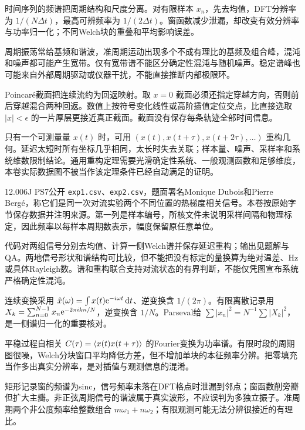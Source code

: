 时间序列的频谱把周期结构和尺度分离。对有限样本 $x_n$，先去均值，DFT分辨率为 $1/(N\Delta t)$，最高可辨频率为 $1/(2\Delta t)$。窗函数减少泄漏，却改变有效分辨率与功率归一化；不同Welch块的重叠和平均影响误差。

周期振荡常给基频和谐波，准周期运动出现多个不成有理比的基频及组合峰，混沌和噪声都可能产生宽带。仅有宽带谱不能区分确定性混沌与随机噪声。稳定谱峰也可能来自外部周期驱动或仪器干扰，不能直接推断内部极限环。

Poincaré截面把连续流约为回返映射。取 $x=0$ 截面必须还指定穿越方向，否则前后穿越混合两种回返。数值上按符号变化线性或高阶插值定位交点，比直接选取 $|x|<\epsilon$ 的一片厚层更接近真正截面。截面没有保存每条轨迹全部时间信息。

只有一个可测量量 $x(t)$ 时，可用 $(x(t),x(t+\tau),x(t+2\tau),\ldots)$ 重构几何。延迟太短时所有坐标几乎相同，太长时失去关联；样本量、噪声、采样率和系统维数限制结论。通用重构定理需要光滑确定性系统、一般观测函数和足够维度，本卷实际数据图不被当作该定理条件已经自动满足的证明。

12.006J PS7公开 \texttt{exp1.csv}、\texttt{exp2.csv}，题面署名Monique Dubois和Pierre Bergé，称它们是同一次对流实验两个不同位置的热梯度相关信号。本卷按原始字节保存数据并注明来源。第一列是样本编号，所核文件未说明采样间隔和物理标定，因此频率以每样本周期数表示，幅度保留原任意单位。

代码对两组信号分别去均值、计算一侧Welch谱并保存延迟重构；输出见题解与QA。两地信号形状和谱结构可比较，但不能把没有标定的量换算为绝对温差、Hz或具体Rayleigh数。谱和重构联合支持对流状态的有界判断，不能仅凭图宣布系统严格确定性混沌。

连续变换采用 $\hat x(\omega)=\int x(t)\mathrm e^{-i\omega t}\,\mathrm d t$、逆变换含 $1/(2\pi)$。有限离散记录用 $X_k=\sum_{n=0}^{N-1}x_n\mathrm e^{-2\pi ikn/N}$，逆变换含 $1/N$。Parseval给 $\sum|x_n|^2=N^{-1}\sum|X_k|^2$，是一侧谱归一化的重要核对。

平稳过程自相关 $C(\tau)=\langle x(t)x(t+\tau)\rangle$ 的Fourier变换为功率谱。有限时段的周期图很噪，Welch分块窗口平均降低方差，但不增加单块的本征频率分辨。把零填充当作多出真实分辨率，是对插值与观测信息的混淆。

矩形记录窗的频谱为sinc，信号频率未落在DFT格点时泄漏到邻点；窗函数削旁瓣但扩大主瓣。非正弦周期信号的谐波属于真实波形，不应误判为多独立振子。准周期两个非公度频率给整数组合 $m\omega_1+n\omega_2$；有限观测可能无法分辨很接近的有理比。

